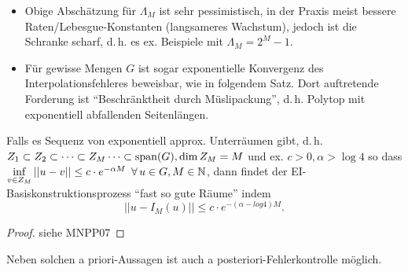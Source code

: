 \begin{bem} \beginwithlistbem
	\begin{itemize}
		\item Obige Abschätzung für $\Lambda_M$ ist sehr pessimistisch, in der Praxis meist bessere Raten/Lebesgue-Konstanten (langsameres Wachstum), jedoch ist die Schranke scharf, d.\,h. es ex. Beispiele mit $\Lambda_M = 2^M-1$.
		\item Für gewisse Mengen $G$ ist sogar exponentielle Konvergenz des Interpolationsfehleres beweisbar, wie in folgendem Satz. Dort auftretende Forderung ist ``Beschränktheit durch Müslipackung'', d.\,h. Polytop mit exponentiell abfallenden Seitenlängen.
	\end{itemize}
\end{bem}

\begin{satz}
Falls es Sequenz von exponentiell approx. Unterräumen gibt, d.\,h. $Z_1 \subset Z_2 \subset \dots \subset Z_M \dots \subset \operatorname{span}(G), \dim Z_M = M$ und ex. $c > 0, \alpha > \log 4$ so dass $\inf\limits_{v \in Z_M} ||u-v|| \leq c \cdot e^{-\alpha M} \,\,\, \forall \, u \in G, M \in \mathbb{N}$, dann findet der EI-Basiskonstruktionsprozess ``fast so gute Räume'' indem
\[
	||u-I_M(u)|| \leq c \cdot e^{-(\alpha - log 4)M}.
\]
\begin{proof}
	siehe MNPP07
\end{proof}
\end{satz}

Neben solchen a priori-Aussagen ist auch a posteriori-Fehlerkontrolle möglich.

